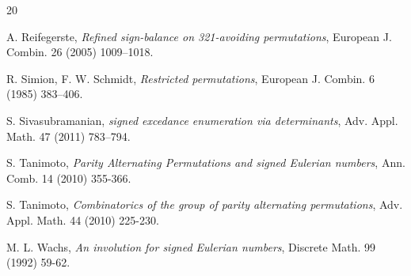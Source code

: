 \documentclass[12pt]{article}
\begin{document}
\begin{thebibliography}{20}

A. Reifegerste, \textit{Refined sign-balance on 321-avoiding permutations}, European J. Combin. 26 (2005) 1009–1018. 

R. Simion, F. W. Schmidt, \textit{Restricted permutations}, European J. Combin. 6 (1985) 383–406.

S. Sivasubramanian, \textit{signed excedance enumeration via determinants}, Adv. Appl. Math. 47 (2011) 783–794. 

S. Tanimoto, \textit{Parity Alternating Permutations and signed Eulerian numbers}, Ann. Comb. 14 (2010) 355-366.

S. Tanimoto, \textit{Combinatorics of the group of parity alternating permutations}, Adv. Appl. Math. 44 (2010) 225-230.

M. L. Wachs, \textit{An involution for signed Eulerian numbers}, Discrete Math. 99 (1992) 59-62. 




 


\end{thebibliography} 
\end{document}
